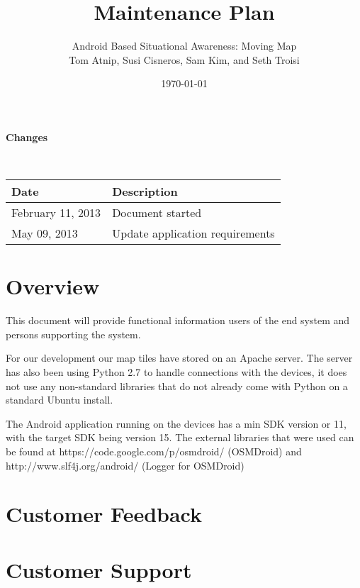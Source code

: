 \documentclass{article}
\begin{document}
\setlength{\voffset}{3.5in}
\title{Maintenance Plan}
\author{\Large Android Based Situational Awareness: Moving Map\\
Tom Atnip, Susi Cisneros, Sam Kim, and Seth Troisi}
\date{\today}
\maketitle
\clearpage
\setlength{\voffset}{0pt}
\tableofcontents
\clearpage


\begin{Large}
\textbf{Changes}
\end{Large}
\\

\begin{tabular}{ | p{1.5in} | p{4.5in} | }
\hline
\textbf{Date} & \textbf{Description}\\
\hline
\hline
February 11, 2013 & Document started\\
\hline
May 09, 2013 & Update application requirements\\
\hline
\end{tabular}
\clearpage

\section{Overview}
This document will provide functional information users of the end system and persons supporting the system.

For our development our map tiles have stored on an Apache server. The server has also been using Python 2.7 to handle connections with the devices, it does not use any non-standard libraries that do not already come with Python on a standard Ubuntu install. 

The Android application running on the devices has a min SDK version or 11, with the target SDK being version 15. The external libraries that were used can be found at https://code.google.com/p/osmdroid/ (OSMDroid) and http://www.slf4j.org/android/ (Logger for OSMDroid)

\section{Customer Feedback}

\section{Customer Support}
\end{document}
